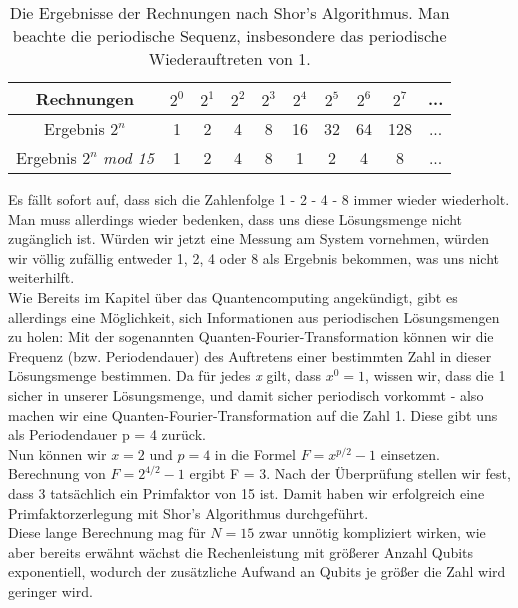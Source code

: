 \documentclass[12pt]{IEEEtran}
\begin{document}
\begin{table*}
    \centering
    \caption{Die Ergebnisse der Rechnungen nach Shor's Algorithmus. Man beachte die periodische Sequenz, insbesondere das periodische Wiederauftreten von 1. \cite{mavroeidis2018impact}}
    \label{tab:shor}
    \begin{tabular}{c|c|c|c|c|c|c|c|c|c}
        Rechnungen & $2^0$ & $2^1$ & $2^2$ & $2^3$ & $2^4$ & $2^5$ & $2^6$ & $2^7$ & ...\\
    \hline \hline
        Ergebnis $2^n$ & 1 & 2 & 4 & 8 & 16 & 32 & 64 & 128 & ...\\
    \hline
        Ergebnis $2^n$ \textit{mod 15} & 1 & 2 & 4 & 8 & 1 & 2 & 4 & 8 & ...\\
    \end{tabular}
\end{table*}

Es fällt sofort auf, dass sich die Zahlenfolge 1 - 2 - 4 - 8 immer wieder wiederholt. Man muss allerdings wieder bedenken, dass uns diese Lösungsmenge nicht zugänglich ist. Würden wir jetzt eine Messung am System vornehmen, würden wir völlig zufällig entweder 1, 2, 4 oder 8 als Ergebnis bekommen, was uns nicht weiterhilft.\\

Wie Bereits im Kapitel über das Quantencomputing angekündigt, gibt es allerdings eine Möglichkeit, sich Informationen aus periodischen Lösungsmengen zu holen: Mit der sogenannten Quanten-Fourier-Transformation können wir die Frequenz (bzw. Periodendauer) des Auftretens einer bestimmten Zahl in dieser Lösungsmenge bestimmen. Da für jedes \textit{x} gilt, dass $x^0 = 1$, wissen wir, dass die 1 sicher in unserer Lösungsmenge, und damit sicher periodisch vorkommt - also machen wir eine Quanten-Fourier-Transformation auf die Zahl 1. Diese gibt uns als Periodendauer p = 4 zurück. \\

Nun können wir $x = 2$ und $p = 4$ in die Formel $F = x^{p/2} - 1$ einsetzen. Berechnung von $F = 2^{4/2}-1$ ergibt F = 3. Nach der Überprüfung stellen wir fest, dass 3 tatsächlich ein Primfaktor von 15 ist. Damit haben wir erfolgreich eine Primfaktorzerlegung mit Shor's Algorithmus durchgeführt. \cite{mavroeidis2018impact} \cite{shor1998quantum} \\

Diese lange Berechnung mag für $N = 15$ zwar unnötig kompliziert wirken, wie aber bereits erwähnt wächst die Rechenleistung mit größerer Anzahl Qubits exponentiell, wodurch der zusätzliche Aufwand an Qubits je größer die Zahl wird geringer wird.
\end{document}
